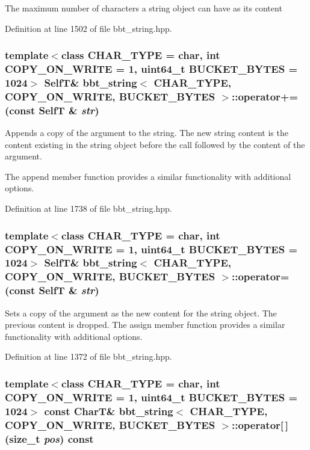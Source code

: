 The maximum number of characters a string object can have as its content 

Definition at line 1502 of file bbt\_\-string.hpp.\hypertarget{classbbt__string_0b1409c335c490f060472fe47c90cfd2}{
\subsubsection[{operator+=}]{\setlength{\rightskip}{0pt plus 5cm}template$<$class CHAR\_\-TYPE  = char, int COPY\_\-ON\_\-WRITE = 1, uint64\_\-t BUCKET\_\-BYTES = 1024$>$ {\bf SelfT}\& {\bf bbt\_\-string}$<$ CHAR\_\-TYPE, COPY\_\-ON\_\-WRITE, BUCKET\_\-BYTES $>$::operator+= (const {\bf SelfT} \& {\em str})}}
\label{classbbt__string_0b1409c335c490f060472fe47c90cfd2}


Appends a copy of the argument to the string. The new string content is the content existing in the string object before the call followed by the content of the argument.

The append member function provides a similar functionality with additional options. 

Definition at line 1738 of file bbt\_\-string.hpp.\hypertarget{classbbt__string_127c0d9e38d27260065d2b8a24cb78c1}{
\subsubsection[{operator=}]{\setlength{\rightskip}{0pt plus 5cm}template$<$class CHAR\_\-TYPE  = char, int COPY\_\-ON\_\-WRITE = 1, uint64\_\-t BUCKET\_\-BYTES = 1024$>$ {\bf SelfT}\& {\bf bbt\_\-string}$<$ CHAR\_\-TYPE, COPY\_\-ON\_\-WRITE, BUCKET\_\-BYTES $>$::operator= (const {\bf SelfT} \& {\em str})}}
\label{classbbt__string_127c0d9e38d27260065d2b8a24cb78c1}


Sets a copy of the argument as the new content for the string object. The previous content is dropped. The assign member function provides a similar functionality with additional options. 

Definition at line 1372 of file bbt\_\-string.hpp.\hypertarget{classbbt__string_40427f0c3552b431b087c9d4c0684f85}{
\subsubsection[{operator[]}]{\setlength{\rightskip}{0pt plus 5cm}template$<$class CHAR\_\-TYPE  = char, int COPY\_\-ON\_\-WRITE = 1, uint64\_\-t BUCKET\_\-BYTES = 1024$>$ const CharT\& {\bf bbt\_\-string}$<$ CHAR\_\-TYPE, COPY\_\-ON\_\-WRITE, BUCKET\_\-BYTES $>$::operator\mbox{[}$\,$\mbox{]} (size\_\-t {\em pos}) const}}
\label{classbbt__string_40427f0c3552b431b087c9d4c0684f85}


